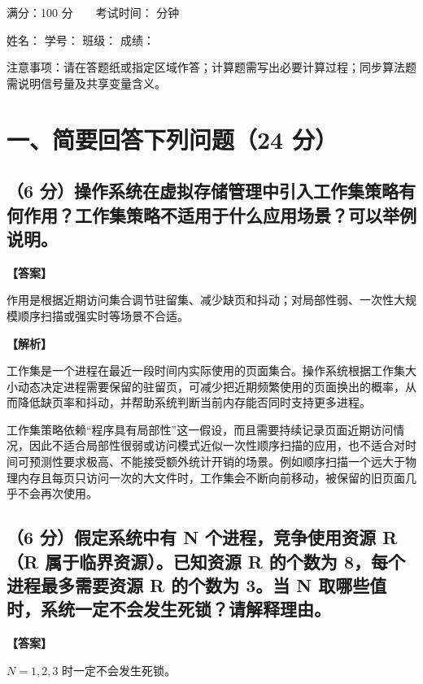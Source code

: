 \documentclass[UTF8,12pt]{ctexart}
\newenvironment{explanation}{\par\noindent\textbf{【解析】}\par\smallskip}{\par\medskip}
\newenvironment{answer}{\par\noindent\textbf{【答案】}\par\smallskip}{\par}
\begin{document}
\begin{center}
满分：100 分　　考试时间：\underline{\hspace{2cm}} 分钟

姓名：\underline{\hspace{2.2cm}} 学号：\underline{\hspace{2.2cm}} 班级：\underline{\hspace{2.2cm}} 成绩：\underline{\hspace{2.2cm}}
\end{center}

\noindent 注意事项：请在答题纸或指定区域作答；计算题需写出必要计算过程；同步算法题需说明信号量及共享变量含义。

\section*{一、简要回答下列问题（24 分）}

\subsection*{（6 分）操作系统在虚拟存储管理中引入工作集策略有何作用？工作集策略不适用于什么应用场景？可以举例说明。}
\begin{answer}
作用是根据近期访问集合调节驻留集、减少缺页和抖动；对局部性弱、一次性大规模顺序扫描或强实时等场景不合适。
\end{answer}

\begin{explanation}
工作集是一个进程在最近一段时间内实际使用的页面集合。操作系统根据工作集大小动态决定进程需要保留的驻留页，可减少把近期频繁使用的页面换出的概率，从而降低缺页率和抖动，并帮助系统判断当前内存能否同时支持更多进程。

工作集策略依赖“程序具有局部性”这一假设，而且需要持续记录页面近期访问情况，因此不适合局部性很弱或访问模式近似一次性顺序扫描的应用，也不适合对时间可预测性要求极高、不能接受额外统计开销的场景。例如顺序扫描一个远大于物理内存且每页只访问一次的大文件时，工作集会不断向前移动，被保留的旧页面几乎不会再次使用。
\end{explanation}
\subsection*{（6 分）假定系统中有 N 个进程，竞争使用资源 R（R 属于临界资源）。已知资源 R 的个数为 8，每个进程最多需要资源 R 的个数为 3。当 N 取哪些值时，系统一定不会发生死锁？请解释理由。}
\begin{answer}
$N=1,2,3$ 时一定不会发生死锁。
\end{answer}
\end{document}
